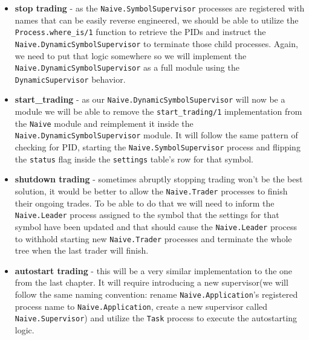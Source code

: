 \documentclass[
  oneside]{book}
\providecommand{\tightlist}{%
  \setlength{\itemsep}{0pt}\setlength{\parskip}{0pt}}
\begin{document}
\begin{itemize}
\tightlist
\item
  \textbf{stop trading} - as the \texttt{Naive.SymbolSupervisor} processes are registered with names that can be easily reverse engineered, we should be able to utilize the \texttt{Process.where\_is/1} function to retrieve the PIDs and instruct the \texttt{Naive.DynamicSymbolSupervisor} to terminate those child processes. Again, we need to put that logic somewhere so we will implement the \texttt{Naive.DynamicSymbolSupervisor} as a full module using the \texttt{DynamicSupervisor} behavior.
\item
  \textbf{start\_trading} - as our \texttt{Naive.DynamicSymbolSupervisor} will now be a module we will be able to remove the \texttt{start\_trading/1} implementation from the \texttt{Naive} module and reimplement it inside the \texttt{Naive.DynamicSymbolSupervisor} module. It will follow the same pattern of checking for PID, starting the \texttt{Naive.SymbolSupervisor} process and flipping the \texttt{status} flag inside the \texttt{settings} table's row for that symbol.
\item
  \textbf{shutdown trading} - sometimes abruptly stopping trading won't be the best solution, it would be better to allow the \texttt{Naive.Trader} processes to finish their ongoing trades. To be able to do that we will need to inform the \texttt{Naive.Leader} process assigned to the symbol that the settings for that symbol have been updated and that should cause the \texttt{Naive.Leader} process to withhold starting new \texttt{Naive.Trader} processes and terminate the whole tree when the last trader will finish.
\item
  \textbf{autostart trading} - this will be a very similar implementation to the one from the last chapter. It will require introducing a new supervisor(we will follow the same naming convention: rename \texttt{Naive.Application}'s registered process name to \texttt{Naive.Application}, create a new supervisor called \texttt{Naive.Supervisor}) and utilize the \texttt{Task} process to execute the autostarting logic.
\end{itemize}
\end{document}

